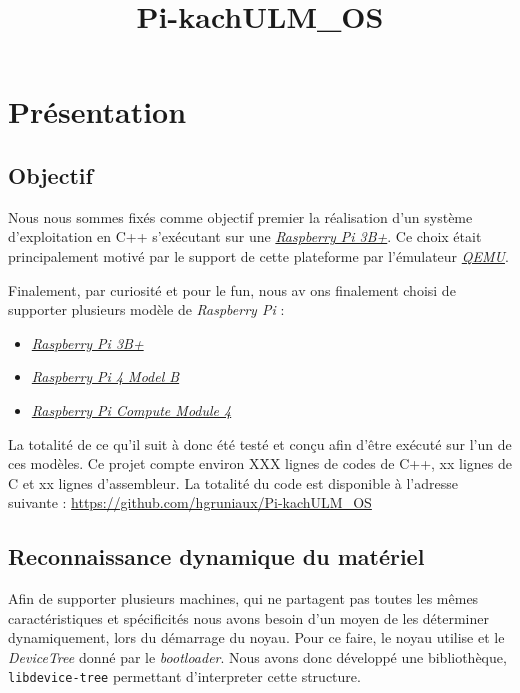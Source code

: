 \documentclass[french, 12pt]{article}
\title{Pi-kachULM\_OS}
\date{}
\begin{document}
\maketitle


\section{Présentation}
\subsection{Objectif}
Nous nous sommes fixés comme objectif premier la réalisation d'un système
d'exploitation en C++ s'exécutant sur une
\href{https://www.raspberrypi.com/products/raspberry-pi-3-model-b-plus/}{\emph{Raspberry Pi 3B+}}.
Ce choix était principalement motivé par le support de cette plateforme par
l'émulateur \href{https://www.qemu.org/}{\emph{QEMU}}.

Finalement, par curiosité et pour le fun\texttrademark, nous av ons finalement
choisi de supporter plusieurs modèle de \emph{Raspberry Pi} :
\begin{itemize}
    \item \href{https://www.raspberrypi.com/products/raspberry-pi-3-model-b-plus/}{\emph{Raspberry Pi 3B+}}
    \item \href{https://www.raspberrypi.com/products/raspberry-pi-4-model-b/}{\emph{Raspberry Pi 4 Model B}}
    \item \href{https://www.raspberrypi.com/products/compute-module-4/?variant=raspberry-pi-cm4001000}{\emph{Raspberry Pi Compute Module 4}}
\end{itemize}

La totalité de ce qu'il suit à donc été testé et conçu afin d'être exécuté sur
l'un de ces modèles. Ce projet compte environ XXX lignes de codes de C++, xx
lignes de C et xx lignes d'assembleur. La totalité du code est disponible à
l'adresse suivante : \url{https://github.com/hgruniaux/Pi-kachULM_OS}

\subsection{Reconnaissance dynamique du matériel}
Afin de supporter plusieurs machines, qui ne partagent pas toutes les mêmes
caractéristiques et spécificités nous avons besoin d'un moyen de les déterminer
dynamiquement, lors du démarrage du noyau. Pour ce faire, le noyau utilise et le
\textit{DeviceTree} donné par le \textit{bootloader}. Nous avons donc développé une
bibliothèque, \texttt{libdevice-tree} permettant d'interpreter cette structure.
\end{document}
